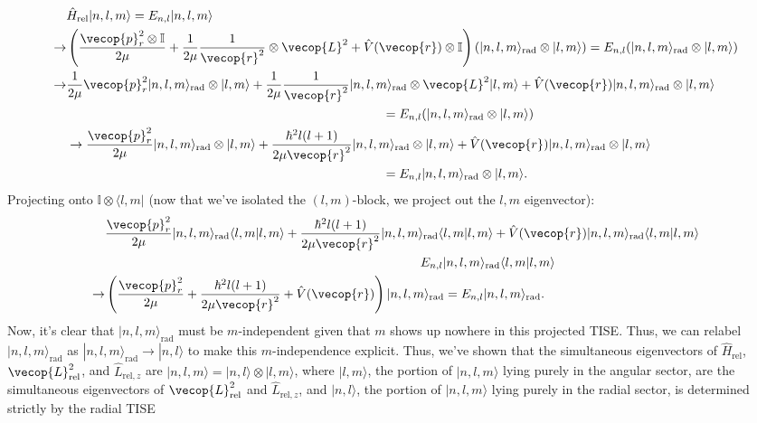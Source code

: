 \begin{align*}
    &\hat{H}_\text{rel}|n,l,m\rangle = E_{n,l}|n,l,m\rangle\\
    \rightarrow&\left(\frac{\vecop{p}^2_r\otimes\mathbb{I}}{2\mu}+\frac{1}{2\mu}\frac{1}{\vecop{r}^2}\otimes\vecop{L}^2+\hat{V}(\vecop{r})\otimes\mathbb{I}\right)\left(|n,l,m\rangle_\text{rad}\otimes|l,m\rangle  \right) = E_{n,l}(|n,l,m\rangle_\text{rad}\otimes|l,m\rangle)\\
    \rightarrow&\frac{1}{2\mu}\vecop{p}^2_r|n,l,m\rangle_\text{rad}\otimes |l,m\rangle+\frac{1}{2\mu}\frac{1}{\vecop{r}^2}|n,l,m\rangle_\text{rad}\otimes \vecop{L}^2|l,m\rangle + \hat{V}(\vecop{r})|n,l,m\rangle_\text{rad}\otimes|l,m\rangle\\
    &\hspace{250pt}=E_{n,l}(|n,l,m\rangle_\text{rad}\otimes|l,m\rangle)\\
    &\rightarrow \frac{\vecop{p}^2_r}{2\mu}|n,l,m\rangle_\text{rad}\otimes|l,m\rangle + \frac{\hbar^2l(l+1)}{2\mu\vecop{r}^2}|n,l,m\rangle_\text{rad}\otimes|l,m\rangle + \hat{V}(\vecop{r})|n,l,m\rangle_\text{rad}\otimes|l,m\rangle\\
    &\hspace{250pt}=E_{n,l}|n,l,m\rangle_\text{rad}\otimes|l,m\rangle.
\end{align*}
Projecting onto $\mathbb{I}\otimes\langle l,m|$ (now that we've isolated the $(l,m)$-block, we project out the $l,m$ eigenvector):
\begin{align*}
    &\frac{\vecop{p}^2_r}{2\mu}|n,l,m\rangle_\text{rad}\langle l,m|l,m\rangle + \frac{\hbar^2l(l+1)}{2\mu\vecop{r}^2}|n,l,m\rangle_\text{rad}\langle l,m|l,m\rangle + \hat{V}(\vecop{r})|n,l,m\rangle_\text{rad}\langle l,m|l,m\rangle\\
    &\hspace{250pt}E_{n,l}|n,l,m\rangle_\text{rad}\langle l,m|l,m\rangle\\
    \rightarrow&\left(\frac{\vecop{p}^2_r}{2\mu} +\frac{\hbar^2l(l+1)}{2\mu\vecop{r}^2}+\hat{V}(\vecop{r}) \right)|n,l,m\rangle_\text{rad} = E_{n,l}|n,l,m\rangle_\text{rad}.
\end{align*}
Now, it's clear that $|n,l,m\rangle_\text{rad}$ must be $m$-independent given that $m$ shows up nowhere in this projected TISE. Thus, we can relabel $|n,l,m\rangle_\text{rad}$ as $|n,l,m\rangle_\text{rad}\rightarrow|n,l\rangle$ to make this $m$-independence explicit. Thus, we've shown that the simultaneous eigenvectors of $\hat{H}_\text{rel}$, $\vecop{L}_\text{rel}^2$, and $\hat{L}_{\text{rel},z}$ are $|n,l,m\rangle=|n,l\rangle\otimes|l,m\rangle$, where $|l,m\rangle$, the portion of $|n,l,m\rangle$ lying purely in the angular sector, are the simultaneous eigenvectors of $\vecop{L}^2_\text{rel}$ and $\hat{L}_{\text{rel},z}$, and $|n,l\rangle$, the portion of $|n,l,m\rangle$ lying purely in the radial sector, is determined strictly by the radial TISE%
